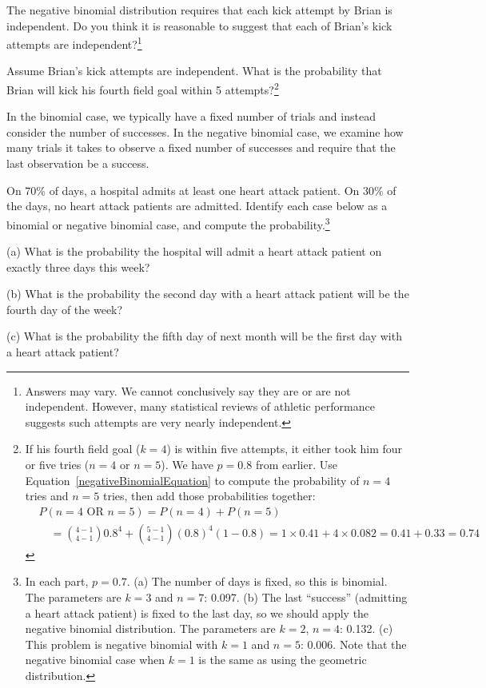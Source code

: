 \begin{exercise}
The negative binomial distribution requires that each kick attempt by Brian is independent. Do you think it is reasonable to suggest that each of Brian's kick attempts are independent?\footnote{Answers may vary. We cannot conclusively say they are or are not independent. However, many statistical reviews of athletic performance suggests such attempts are very nearly independent.}
\end{exercise}

\begin{exercise}
Assume Brian's kick attempts are independent. What is the probability that Brian will kick his fourth field goal within 5 attempts?\footnote{If his fourth field goal ($k=4$) is within five attempts, it either took him four or five tries ($n=4$ or $n=5$). We have $p=0.8$ from earlier. Use Equation~\eqref{negativeBinomialEquation} to compute the probability of $n=4$ tries and $n=5$ tries, then add those probabilities together:
\begin{align*}
& P(n=4\text{ OR }n=5) = P(n=4) + P(n=5) \\
&\quad = {4-1 \choose 4-1} 0.8^4 + {5-1 \choose 4-1} (0.8)^4(1-0.8) = 1\times 0.41 + 4\times 0.082 = 0.41 + 0.33 = 0.74
\end{align*}}
\end{exercise}

\begin{tipBox}{
In the binomial case, we typically have a fixed number of trials and instead consider the number of successes. In the negative binomial case, we examine how many trials it takes to observe a fixed number of successes and require that the last observation be a success.}
\end{tipBox}

\begin{exercise}
On 70\% of days, a hospital admits at least one heart attack patient. On 30\% of the days, no heart attack patients are admitted. Identify each case below as a binomial or negative binomial case, and compute the probability.\footnote{In each part, $p=0.7$. (a) The number of days is fixed, so this is binomial. The parameters are $k=3$ and $n=7$: 0.097. (b) The last ``success'' (admitting a heart attack patient) is fixed to the last day, so we should apply the negative binomial distribution. The parameters are $k=2$, $n=4$: 0.132. (c) This problem is negative binomial with $k=1$ and $n=5$: 0.006. Note that the negative binomial case when $k=1$ is the same as using the geometric distribution.}

(a) What is the probability the hospital will admit a heart attack patient on exactly three days this week?

(b) What is the probability the second day with a heart attack patient will be the fourth day of the week?

(c) What is the probability the fifth day of next month will be the first day with a heart attack patient?
\end{exercise}


